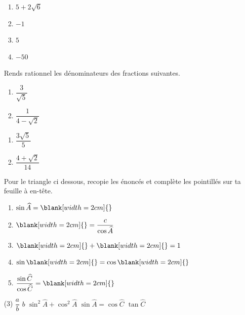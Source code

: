 \documentclass[a4paper, 12pt, parskip=half-]{scrartcl}
\begin{document}
\begin{solution}
    \begin{enumerate}[cols=2]
        \item $5+2\sqrt{6}$
        \item $-1$
        \item $5$
        \item $-50$
    \end{enumerate}
\end{solution}

\newpage

\begin{exercise}[points=2]
    Rends rationnel les dénominateurs des fractions suivantes.
    \begin{enumerate}[cols=2]
        \item $\dfrac{3}{\sqrt{5}}$
        \item $\dfrac{1}{4-\sqrt{2}}$
    \end{enumerate}
\end{exercise}
\begin{solution}
    \begin{enumerate}
        \item $\dfrac{3\sqrt{5}}{5}$
        \item $\dfrac{4 + \sqrt{2}}{14}$
    \end{enumerate}
\end{solution}

\begin{exercise}[points=5]
    Pour le triangle ci dessous, recopie les énoncés et complète les pointillés sur ta feuille à en-tête.
    \begin{center}
        
    \end{center}
    \bigbreak
    \begin{enumerate}[cols=2]
        \item $\sin \widehat{A} = \blank[width=2cm]{}$
        \item $ \blank[width=2cm]{} = \dfrac{c}{\cos \widehat{A}}$
        \item $ \blank[width=2cm]{} + \blank[width=2cm]{} = 1$
        \item $ \sin \blank[width=2cm]{} = \cos \blank[width=2cm]{}$
        \item $ \dfrac{\sin\widehat{C}}{\cos\widehat{C}} = \blank[width=2cm]{}$
    \end{enumerate}   
\end{exercise}
\begin{solution}
    \begin{tasks}[label=\textbf{\alph*)}](3)
        \task $\dfrac{a}{b}$
        \task $b$
        \task $\sin^2 \widehat{A} + \cos^2 \widehat{A}$
        \task $\sin \widehat{A} = \cos\widehat{C}$
        \task $\tan\widehat{C}$
    \end{tasks}
\end{solution}
\end{document}
